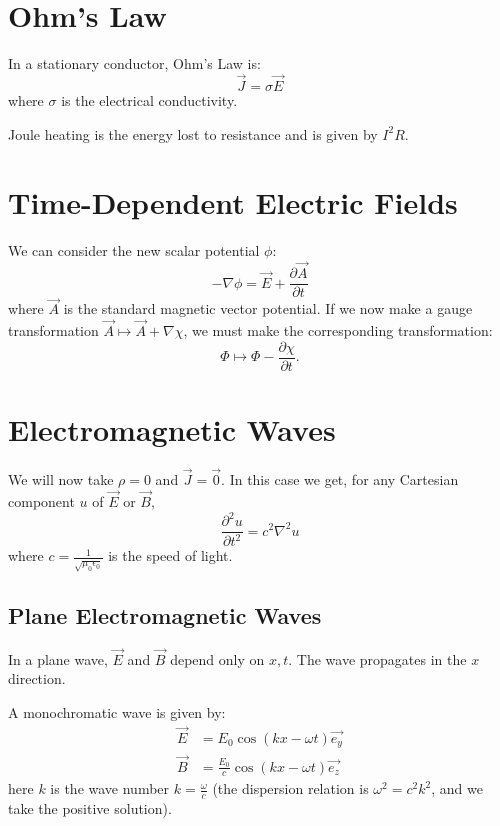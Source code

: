 \documentclass[../Main.tex]{subfiles}
\begin{document}
\section{Ohm's Law}
In a stationary conductor, Ohm's Law is:
\begin{equation*}
    \vec{J} = \sigma \vec{E}
\end{equation*}
where $\sigma$ is the electrical conductivity.

Joule heating is the energy lost to resistance and is given by $I^2 R$.
\section{Time-Dependent Electric Fields}
We can consider the new scalar potential $\phi$:
\begin{equation*}
    -\nabla \phi = \vec{E} + \frac{\partial \vec{A}}{\partial t}
\end{equation*}
where $\vec{A}$ is the standard magnetic vector potential. If we now make a gauge transformation $\vec{A} \mapsto \vec{A} + \nabla \chi$, we must make the corresponding transformation:
\begin{equation*}
    \Phi \mapsto \Phi - \frac{\partial \chi}{\partial t}.
\end{equation*}
\section{Electromagnetic Waves}
We will now take $\rho = 0$ and $\vec{J} = \vec0$. In this case we get, for any Cartesian component $u$ of $\vec{E}$ or $\vec{B}$,
\begin{equation*}
    \frac{\partial^{2}u}{\partial t^{2}} = c^2 \nabla^2 u
\end{equation*}
where $c = \frac1{\sqrt{\mu_0 \epsilon_0}}$ is the speed of light.
\subsection{Plane Electromagnetic Waves}
In a plane wave, $\vec{E}$ and $\vec{B}$ depend only on $x, t$. The wave propagates in the $x$ direction.

A monochromatic wave is given by:
\begin{align*}
    \vec{E} &= E_0 \cos(kx - \omega t)\vec{e_y} \\
    \vec{B} &= \frac{E_0}{c} \cos(kx - \omega t) \vec{e_z}
\end{align*}
here $k$ is the wave number $k = \frac{\omega}{c}$ (the dispersion relation is $\omega^2 = c^2 k^2$, and we take the positive solution).
\end{document}
